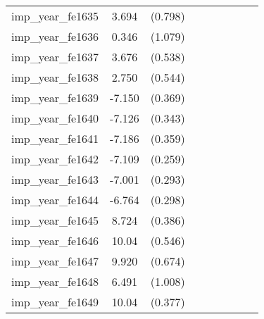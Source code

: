 {\begin{tabular}{l*{4}{cc}}
imp\_year\_fe1635&    3.694\sym{***}&  (0.798)&                  &         &                  &         &                  &         \\
imp\_year\_fe1636&    0.346         &  (1.079)&                  &         &                  &         &                  &         \\
imp\_year\_fe1637&    3.676\sym{***}&  (0.538)&                  &         &                  &         &                  &         \\
imp\_year\_fe1638&    2.750\sym{***}&  (0.544)&                  &         &                  &         &                  &         \\
imp\_year\_fe1639&   -7.150\sym{***}&  (0.369)&                  &         &                  &         &                  &         \\
imp\_year\_fe1640&   -7.126\sym{***}&  (0.343)&                  &         &                  &         &                  &         \\
imp\_year\_fe1641&   -7.186\sym{***}&  (0.359)&                  &         &                  &         &                  &         \\
imp\_year\_fe1642&   -7.109\sym{***}&  (0.259)&                  &         &                  &         &                  &         \\
imp\_year\_fe1643&   -7.001\sym{***}&  (0.293)&                  &         &                  &         &                  &         \\
imp\_year\_fe1644&   -6.764\sym{***}&  (0.298)&                  &         &                  &         &                  &         \\
imp\_year\_fe1645&    8.724\sym{***}&  (0.386)&                  &         &                  &         &                  &         \\
imp\_year\_fe1646&    10.04\sym{***}&  (0.546)&                  &         &                  &         &                  &         \\
imp\_year\_fe1647&    9.920\sym{***}&  (0.674)&                  &         &                  &         &                  &         \\
imp\_year\_fe1648&    6.491\sym{***}&  (1.008)&                  &         &                  &         &                  &         \\
imp\_year\_fe1649&    10.04\sym{***}&  (0.377)&                  &         &                  &         &                  &         \\

\end{tabular}}
